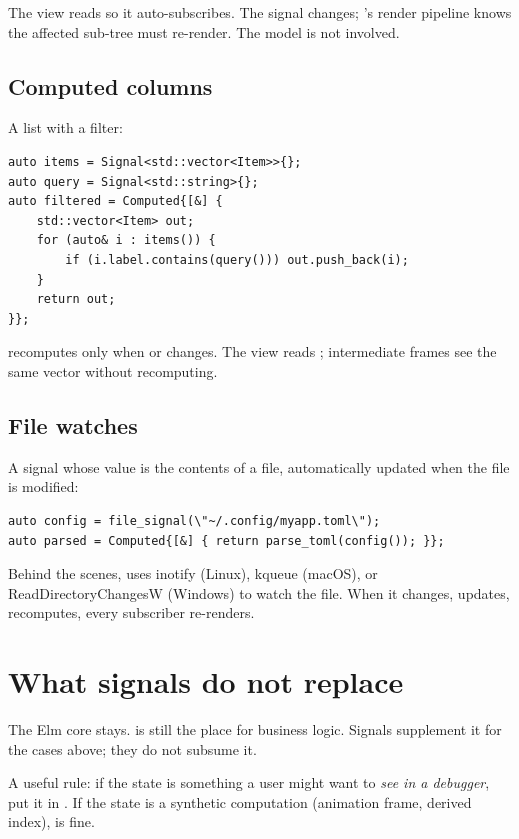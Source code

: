 The view reads  so it auto-subscribes. The signal
changes; \maya{}'s render pipeline knows the affected sub-tree
must re-render. The model is not involved.

\subsection*{Computed columns}

A list with a filter:

\begin{lstlisting}
auto items = Signal<std::vector<Item>>{};
auto query = Signal<std::string>{};
auto filtered = Computed{[&] {
    std::vector<Item> out;
    for (auto& i : items()) {
        if (i.label.contains(query())) out.push_back(i);
    }
    return out;
}};
\end{lstlisting}

 recomputes only when  or
 changes. The view reads ;
intermediate frames see the same vector without recomputing.

\subsection*{File watches}

A signal whose value is the contents of a file, automatically
updated when the file is modified:

\begin{lstlisting}
auto config = file_signal(\"~/.config/myapp.toml\");
auto parsed = Computed{[&] { return parse_toml(config()); }};
\end{lstlisting}

Behind the scenes,  uses inotify (Linux),
kqueue (macOS), or ReadDirectoryChangesW (Windows) to watch the
file. When it changes,  updates, 
recomputes, every subscriber re-renders.

\section{What signals do not replace}

The Elm core stays.  is still the place for
business logic. Signals supplement it for the cases above; they
do not subsume it.

A useful rule: if the state is something a user might want to
\emph{see in a debugger}, put it in . If the state
is a synthetic computation (animation frame, derived index),
 is fine.

